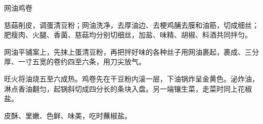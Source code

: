 \begin{recipe}{网油鸡卷}

\ingredients


\preparation

\step 慈菇削皮，调蛋清豆粉；网油洗净，去厚油边、去梗鸡脯去膜和油筋，切成细丝；
肥瘦肉、火腿、香菌、慈菇均分别切细丝，加盐、味精、胡椒、料酒共同拌匀。

\step 网油平铺案上，先抹上蛋清豆粉，再把拌好味的各种丝子用网油裹起，裹成、三分
厚、一寸五宽的卷约四至六条，用刀尖放气。

\step 旺火将油烧五至六成热。鸡卷先在干豆粉内滚一层，下油锅炸呈金黄色。泌炸油，
淋点香油翻匀，起锅斜切成四分长的条块入盘。另一端镶生菜，走菜时同上花椒盐。

\features

皮酥、里嫩、色鲜、味美，吃时蘸椒盐。

\end{recipe}

